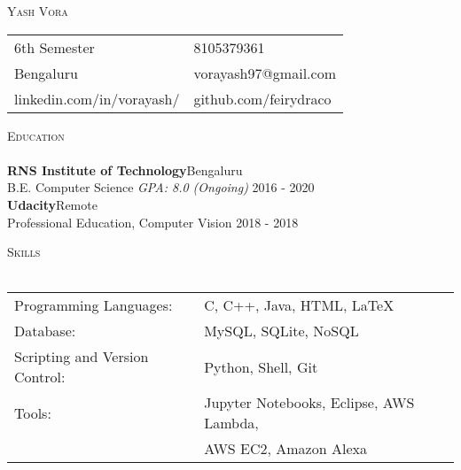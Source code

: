 \documentclass[12pt, a4paper]{article}
\newcommand{\lineunder} {
    \vspace*{-8pt} \\
    \hspace*{-18pt} \hrulefill \\
}
\newcommand{\header} [1] {
    {\hspace*{-18pt}\vspace*{6pt} \textsc{#1}}
    \vspace*{-6pt} \lineunder
}
\begin{document}
\vspace*{-40pt}

    

\vspace*{-10pt}
\begin{center}
	{\Huge \scshape {Yash Vora}}
\end{center}


\begin{tabularx}{\textwidth}{X l}
6th Semester & 8105379361  \\
Bengaluru & vorayash97@gmail.com \\
linkedin.com/in/vorayash/ & github.com/feirydraco \\ 
\end{tabularx}

\header{Education}
\textbf{RNS Institute of Technology}\hfill Bengaluru\\
B.E. Computer Science \textit{GPA: 8.0 (Ongoing)} \hfill 2016 - 2020\\
\vspace{2mm}
\textbf{Udacity}\hfill Remote\\
Professional Education, Computer Vision \hfill 2018 - 2018\\
\vspace{2mm}



\header{Skills}
\begin{tabular}{ l l }
	Programming Languages:         & C, C++, Java, HTML, \LaTeX                                      \\
	Database:                      & MySQL, SQLite, NoSQL                                      \\
	Scripting and Version Control: & Python, Shell, Git                                        \\
	Tools:                         & Jupyter Notebooks, Eclipse, AWS Lambda, \\
 													 & AWS EC2, Amazon Alexa \\
\end{tabular}
\vspace{2mm}
\end{document}
